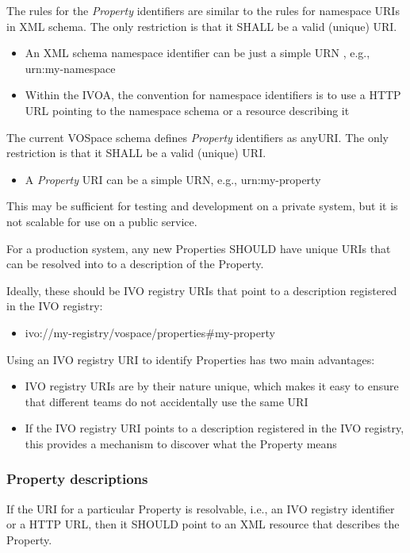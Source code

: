\documentclass[11pt,a4paper]{ivoa}
\begin{document}
The rules for the \emph{Property} identifiers are similar to the rules for namespace URIs in XML schema. The only restriction is that it SHALL be a valid (unique) URI.

\begin{itemize}
    \item An XML schema namespace identifier can be just a simple URN \citep{std:RFC2141}, e.g., urn:my-namespace
    \item Within the IVOA, the convention for namespace identifiers is to use a HTTP URL pointing to the namespace schema or a resource describing it
\end{itemize}

The current VOSpace schema defines \emph{Property} identifiers as anyURI. The only restriction is that it SHALL be a valid (unique) URI.

\begin{itemize}
    \item A \emph{Property} URI can be a simple URN, e.g., urn:my-property
\end{itemize}

This may be sufficient for testing and development on a private system, but it is not scalable for use on a public service.

For a production system, any new Properties SHOULD have unique URIs that can be resolved into to a description of the Property.

Ideally, these should be IVO registry URIs that point to a description registered in the IVO registry:

\begin{itemize}
    \item ivo://my-registry/vospace/properties\#my-property
\end{itemize}

Using an IVO registry URI to identify Properties has two main advantages:

\begin{itemize}
    \item IVO registry URIs are by their nature unique, which makes it easy to ensure that different teams do not accidentally use the same URI
    \item If the IVO registry URI points to a description registered in the IVO registry, this provides a mechanism to discover what the Property means
\end{itemize}

\subsubsection{Property descriptions}
\label{subsubsec:property descriptions}
If the URI for a particular Property is resolvable, i.e., an IVO registry identifier or a HTTP URL, then it SHOULD point to an XML resource that describes the Property.
\end{document}
